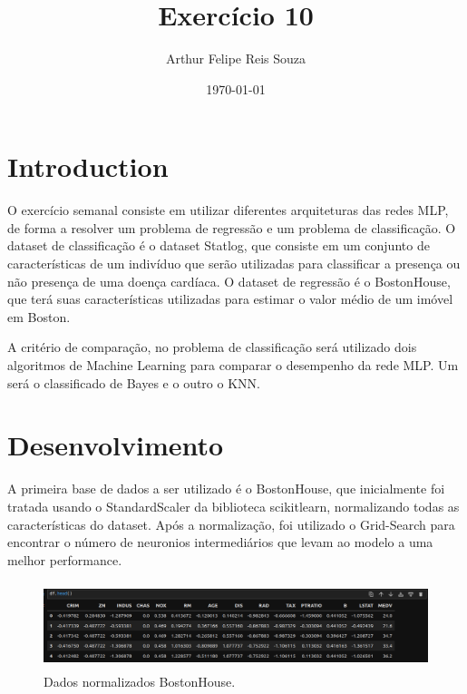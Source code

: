 \documentclass{article}
\begin{document}
\title{Exercício 10} 
\author{Arthur Felipe Reis Souza}
\date{\today}
\maketitle





\section{Introduction}

\vspace{10pt}

O exercício semanal consiste em utilizar diferentes arquiteturas das redes MLP, de forma a resolver um problema de regressão e um problema de classificação. O dataset de classificação é o dataset Statlog, que consiste em um conjunto de características de um indivíduo que serão utilizadas para classificar a presença ou não presença de uma doença cardíaca. O dataset de regressão é o BostonHouse, que terá suas características utilizadas para estimar o valor médio de um imóvel em Boston.

\vspace{10pt}

A critério de comparação, no problema de classificação será utilizado dois algoritmos de Machine Learning para comparar o desempenho da rede MLP. Um será o classificado de Bayes e o outro o KNN.

\vspace{10pt}

\section{Desenvolvimento}

\vspace{10pt}

A primeira base de dados a ser utilizado é o BostonHouse, que inicialmente foi tratada usando o StandardScaler da biblioteca scikitlearn, normalizando todas as características do dataset. Após a normalização, foi utilizado o Grid-Search para encontrar o número de neuronios intermediários que levam ao modelo a uma melhor performance.

\vspace{10pt}

\begin{figure}[h]

    \centering
    \includegraphics[height=1in]{dados_normalizados.png}
    \caption{Dados normalizados BostonHouse.}
    \label{fig:example}
    
\end{figure}
\end{document}
